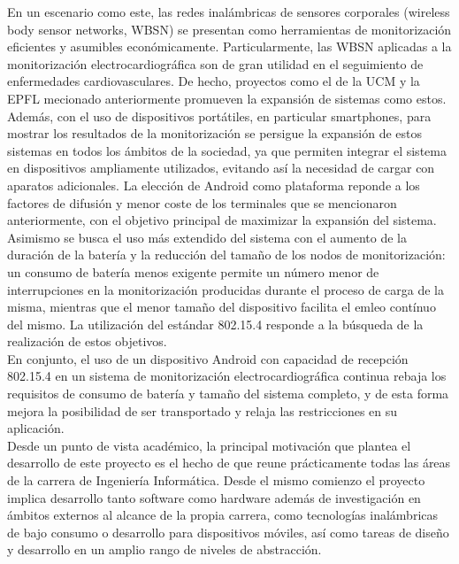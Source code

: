 	En un escenario como este, las redes inalámbricas de sensores corporales (wireless body sensor
	networks, WBSN) se presentan como herramientas de monitorización eficientes y asumibles
	económicamente. Particularmente, las WBSN aplicadas a la monitorización electrocardiográfica son
	de gran utilidad en el seguimiento de enfermedades cardiovasculares. De hecho, proyectos como el
	de la UCM y la EPFL mecionado anteriormente promueven la expansión de sistemas como estos.\\

	Además, con el uso de dispositivos portátiles, en particular smartphones, para mostrar los
	resultados de la monitorización se persigue la expansión de estos sistemas en todos los ámbitos
	de la sociedad, ya que permiten integrar el sistema en dispositivos ampliamente utilizados, 
	evitando así la necesidad de cargar con aparatos adicionales. La elección de Android como 
	plataforma reponde a	los factores de difusión y menor coste de los terminales que se mencionaron 
	anteriormente, con el objetivo principal 	de maximizar la expansión del sistema.\\

	Asimismo se busca el uso más extendido del sistema con el aumento de la duración de la
	batería y la reducción del tamaño de los nodos de monitorización: un consumo de batería menos
	exigente permite un número menor de interrupciones en la monitorización producidas durante el
	proceso de carga de la misma, mientras que el menor tamaño del dispositivo facilita el emleo
	contínuo del mismo. La utilización del estándar 802.15.4 responde a la búsqueda de la
	realización de estos objetivos.\\

	En conjunto, el uso de un dispositivo Android con capacidad de recepción 802.15.4 en un
	sistema de monitorización electrocardiográfica continua rebaja los requisitos de consumo de batería
	y tamaño del sistema completo, y de esta forma mejora la posibilidad de ser transportado y relaja
	las restricciones en su aplicación.\\

	Desde un punto de vista académico, la principal motivación que plantea el desarrollo de este
	proyecto es el hecho de que reune prácticamente todas las áreas de la carrera de Ingeniería
	Informática. Desde el mismo comienzo el proyecto implica desarrollo tanto software como
	hardware además de investigación en ámbitos externos al alcance de la propia carrera,
	como tecnologías inalámbricas de bajo consumo	o desarrollo para dispositivos móviles, así como 
	tareas de diseño y desarrollo en un amplio rango de niveles de abstracción.\\

